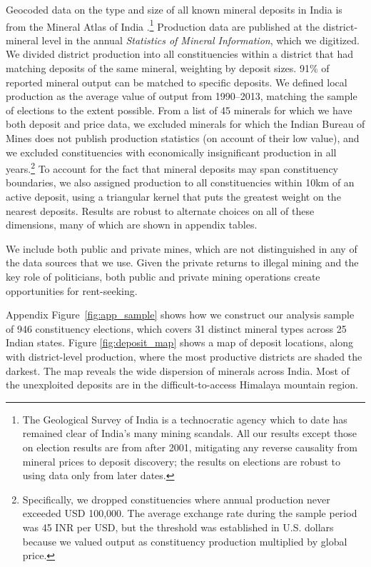 \documentclass[12pt,letterpaper]{article}
\begin{document}
Geocoded data on the type and size of all known mineral deposits in
India is from the Mineral Atlas of India
\cite{GeologicalSurveyofIndia2001}.\footnote{The Geological Survey of
  India is a technocratic agency which to date has remained clear of
  India's many mining scandals.  All our results except those on
  election results are from after 2001, mitigating any reverse
  causality from mineral prices to deposit discovery; the results on
  elections are robust to using data only from later dates.}
Production data are published at the district-mineral level in the
annual \textit{Statistics of Mineral Information}, which we
digitized. We divided district production into all constituencies
within a district that had matching deposits of the same mineral,
weighting by deposit sizes. 91\% of reported mineral output can be
matched to specific deposits. We defined local production as the
average value of output from 1990--2013, matching the sample of
elections to the extent possible. From a list of 45 minerals for which
we have both deposit and price data, we excluded minerals for which
the Indian Bureau of Mines does not publish production statistics (on
account of their low value), and we excluded constituencies with
economically insignificant production in all
years.\footnote{Specifically, we dropped constituencies where annual
  production never exceeded USD 100,000. The average exchange rate
  during the sample period was 45 INR per USD, but the threshold was
  established in U.S. dollars because we valued output as constituency
  production multiplied by global price.}  To account for the fact
that mineral deposits may span constituency boundaries, we also
assigned production to all constituencies within 10km of an active
deposit, using a triangular kernel that puts the greatest weight on
the nearest deposits. Results are robust to alternate choices on all
of these dimensions, many of which are shown in appendix tables.

We include both public and private mines, which are not distinguished
in any of the data sources that we use. Given the private returns to
illegal mining and the key role of politicians, both public and
private mining operations create opportunities for rent-seeking. 

Appendix Figure~\ref{fig:app_sample} shows how we construct our
analysis sample of 946 constituency elections, which covers 31
distinct mineral types across 25 Indian states. Figure
\ref{fig:deposit_map} shows a map of deposit locations, along
with district-level production, where the most productive districts
are shaded the darkest. The map reveals the wide dispersion of
minerals across India. Most of the unexploited deposits are in the
difficult-to-access Himalaya mountain region.
\end{document}
